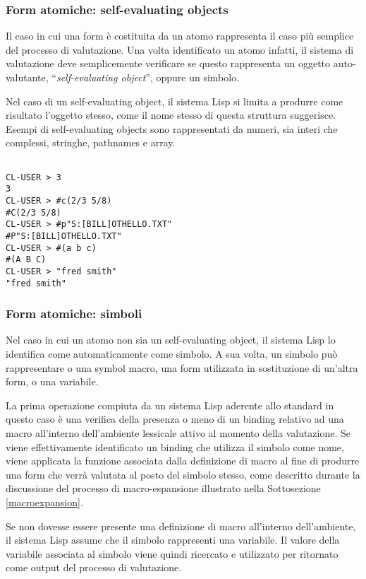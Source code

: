 \subsubsection{Form atomiche: self-evaluating objects}

Il caso in cui una form è costituita da un atomo rappresenta il caso più
semplice del processo di valutazione. Una volta identificato un atomo infatti,
il sistema di valutazione deve semplicemente verificare se questo rappresenta
un oggetto auto-valutante, \enquote{\textit{self-evaluating object}}, oppure un
simbolo.

Nel caso di un self-evaluating object, il sistema Lisp si limita a produrre
come risultato l’oggetto stesso, come il nome stesso di questa struttura
suggerisce. Esempi di self-evaluating objects sono rappresentati da numeri,
sia interi che complessi, stringhe, pathnames e array.

\begin{lstlisting}[caption=Esempi di form di tipo self-evaluating object]

CL-USER > 3
3
CL-USER > #c(2/3 5/8)
#C(2/3 5/8)
CL-USER > #p"S:[BILL]OTHELLO.TXT"
#P"S:[BILL]OTHELLO.TXT"
CL-USER > #(a b c)
#(A B C)
CL-USER > "fred smith"
"fred smith"

\end{lstlisting}

\subsubsection{Form atomiche: simboli}

Nel caso in cui un atomo non sia un self-evaluating object, il sistema Lisp lo
identifica come automaticamente come simbolo. A sua volta, un simbolo può
rappresentare o una symbol macro, una form utilizzata in sostituzione di
un’altra form, o una variabile.

La prima operazione compiuta da un sistema Lisp aderente allo standard in
questo caso è una verifica della presenza o meno di un binding relativo ad una
macro all’interno dell'ambiente lessicale attivo al momento della valutazione.
Se viene effettivamente identificato un binding che utilizza il simbolo come
nome, viene applicata la funzione associata dalla definizione di macro al fine
di produrre una form che verrà valutata al posto del simbolo stesso, come
descritto durante la discussione del processo di macro-espansione illustrato
nella Sottosezione \ref{macroexpansion}.

Se non dovesse essere presente una definizione di macro all’interno
dell’ambiente, il sistema Lisp assume che il simbolo rappresenti una
variabile. Il valore della variabile associata al simbolo viene quindi
ricercato e utilizzato per ritornato come output del processo di
valutazione.\\

